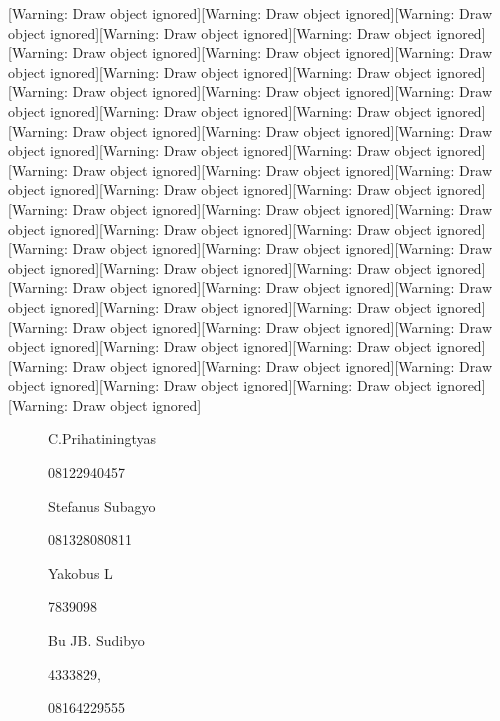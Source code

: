 \documentclass{article}
\begin{document}
[Warning: Draw object ignored][Warning: Draw object ignored][Warning: Draw object ignored][Warning: Draw object ignored][Warning: Draw object ignored][Warning: Draw object ignored][Warning: Draw object ignored][Warning: Draw object ignored][Warning: Draw object ignored][Warning: Draw object ignored][Warning: Draw object ignored][Warning: Draw object ignored][Warning: Draw object ignored][Warning: Draw object ignored][Warning: Draw object ignored][Warning: Draw object ignored][Warning: Draw object ignored][Warning: Draw object ignored][Warning: Draw object ignored][Warning: Draw object ignored][Warning: Draw object ignored][Warning: Draw object ignored][Warning: Draw object ignored][Warning: Draw object ignored][Warning: Draw object ignored][Warning: Draw object ignored][Warning: Draw object ignored][Warning: Draw object ignored][Warning: Draw object ignored][Warning: Draw object ignored][Warning: Draw object ignored][Warning: Draw object ignored][Warning: Draw object ignored][Warning: Draw object ignored][Warning: Draw object ignored][Warning: Draw object ignored][Warning: Draw object ignored][Warning: Draw object ignored][Warning: Draw object ignored][Warning: Draw object ignored][Warning: Draw object ignored][Warning: Draw object ignored][Warning: Draw object ignored][Warning: Draw object ignored][Warning: Draw object ignored][Warning: Draw object ignored][Warning: Draw object ignored][Warning: Draw object ignored][Warning: Draw object ignored][Warning: Draw object ignored][Warning: Draw object ignored]
\begin{figure}
\centering
\begin{minipage}{3.371cm}
C.Prihatiningtyas

08122940457

\end{minipage}
\end{figure}
\begin{figure}
\centering
\begin{minipage}{4.175cm}
Stefanus Subagyo

081328080811

\end{minipage}
\end{figure}
\begin{figure}
\centering
\begin{minipage}{2.365cm}
Yakobus L

7839098

\end{minipage}
\end{figure}
\begin{figure}
\centering
\begin{minipage}{3.17cm}
Bu JB. Sudibyo

4333829, 

08164229555

\end{minipage}
\end{figure}
\end{document}

